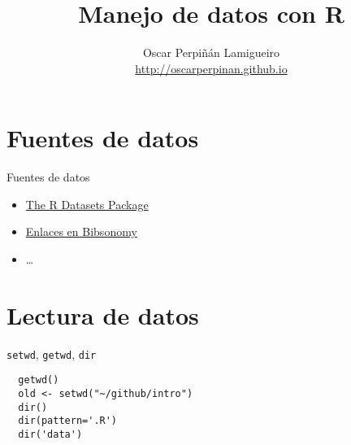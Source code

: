 \documentclass[xcolor={usenames,svgnames,dvipsnames}]{beamer}
\author{Oscar Perpiñán Lamigueiro \\ \url{http://oscarperpinan.github.io}}
\date{}
\title{Manejo de datos con R}
\begin{document}
\maketitle


\section{Fuentes de datos}
\label{sec-1}
\begin{frame}[label=sec-1-1]{Fuentes de datos}
\begin{itemize}
\item \href{http://stat.ethz.ch/R-manual/R-patched/library/datasets/html/00Index.html}{The R Datasets Package}

\item \href{http://www.bibsonomy.org/user/procomun/data}{Enlaces en Bibsonomy}

\item \ldots{}
\end{itemize}
\end{frame}

\section{Lectura de datos}
\label{sec-2}
\begin{frame}[fragile,label=sec-2-1]{\texttt{setwd}, \texttt{getwd}, \texttt{dir}}
 \lstset{language=R,label= ,caption= ,numbers=none}
\begin{lstlisting}
  getwd()
  old <- setwd("~/github/intro")
  dir()
  dir(pattern='.R')
  dir('data')
\end{lstlisting}
\end{frame}
\end{document}
